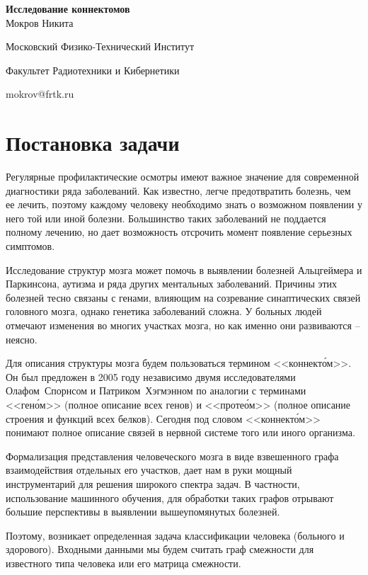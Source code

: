 \documentclass{urticle}
\begin{document}
\begin{center}
{\LARGE \textbf{Исследование коннектомов\\}}
\vspace{1cm}
{\Large Мокров Никита}

{\large Московский Физико-Технический Институт}

{\large Факультет Радиотехники и Кибернетики}

{\large mokrov@frtk.ru}
\end{center}

\section*{Постановка задачи}
Регулярные профилактические осмотры имеют важное значение для современной диагностики ряда заболеваний. Как известно, легче предотвратить болезнь, чем ее лечить, поэтому каждому человеку необходимо знать о возможном появлении у него той или иной болезни. Большинство таких заболеваний не поддается полному лечению, но дает возможность отсрочить момент появление серьезных симптомов.

Исследование структур мозга может помочь в выявлении болезней Альцгеймера и Паркинсона, аутизма и ряда других ментальных заболеваний. Причины этих болезней тесно связаны с генами, влияющим на созревание синаптических связей головного мозга, однако генетика заболеваний сложна. У больных людей отмечают изменения во многих участках мозга, но как именно они развиваются -- неясно.

Для описания структуры мозга будем пользоваться термином <<коннект\'{о}м>>. Он был предложен в 2005 году независимо двумя исследователями Олафом~Спорнсом и Патриком~Хэгмэнном по аналогии с терминами <<ген\'{о}м>> (полное описание всех генов) и <<проте\'{о}м>> (полное описание строения и функций всех белков). Сегодня под словом <<коннект\'{о}м>> понимают полное описание связей в нервной системе того или иного организма.

Формализация представления человеческого мозга в виде взвешенного графа взаимодействия отдельных его участков, дает нам в руки мощный инструментарий для решения широкого спектра задач. В частности, использование машинного обучения, для обработки таких графов отрывают большие перспективы в выявлении вышеупомянутых болезней.

Поэтому, возникает определенная задача классификации человека (больного и здорового). Входными данными мы будем считать граф смежности для известного типа человека или его матрица смежности.
\end{document}
